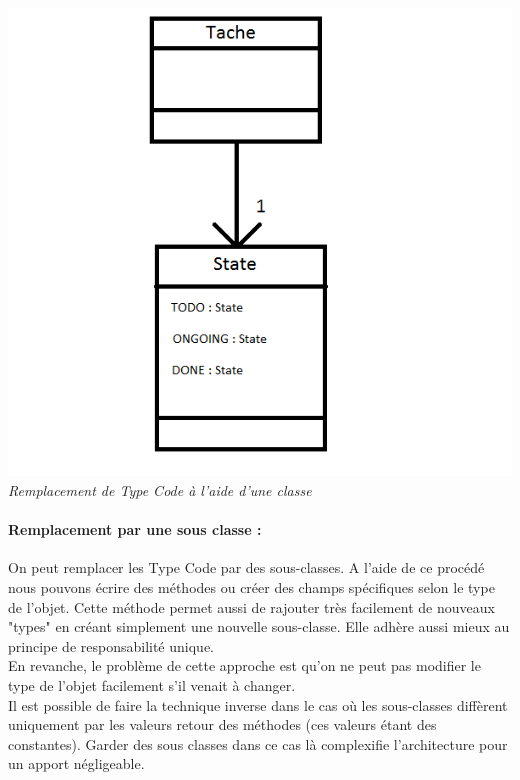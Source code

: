 \documentclass[a4paper,twoside,12pt,openright]{report}
\begin{document}
\begin{center}
\includegraphics[scale=1]{Image/TypeCodeClasse.png}\\
\itshape{Remplacement de Type Code à l'aide d'une classe}
\end{center}

\paragraph{Remplacement par une sous classe :}
On peut remplacer les Type Code par des sous-classes. A l'aide de ce procédé nous pouvons écrire des méthodes ou créer des champs spécifiques selon le type de l'objet. Cette méthode permet aussi de rajouter très facilement de nouveaux "types" en créant simplement une nouvelle sous-classe.
Elle adhère aussi mieux au principe de responsabilité unique.\\
En revanche, le problème de cette approche est qu'on ne peut pas modifier le type de l'objet facilement s'il venait à changer.\\
Il est possible de faire la technique inverse dans le cas où les sous-classes diffèrent uniquement par les valeurs retour des méthodes (ces valeurs étant des constantes). Garder des sous classes dans ce cas là complexifie l'architecture pour un apport négligeable.
\end{document}
